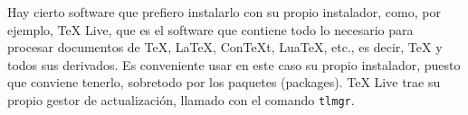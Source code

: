 Hay cierto software que prefiero instalarlo con su propio instalador, como, por ejemplo, \TeX{} Live, que es el
software que contiene todo lo necesario para procesar documentos de \TeX{}, \LaTeX{}, ConTeXt, LuaTeX,
etc., es decir, \TeX{} y todos sus derivados. Es conveniente usar en este caso su propio instalador, puesto que
conviene tenerlo, sobretodo por los paquetes (packages). \TeX{} Live trae su propio gestor de actualización,
llamado con el comando \lstinline!tlmgr!.
